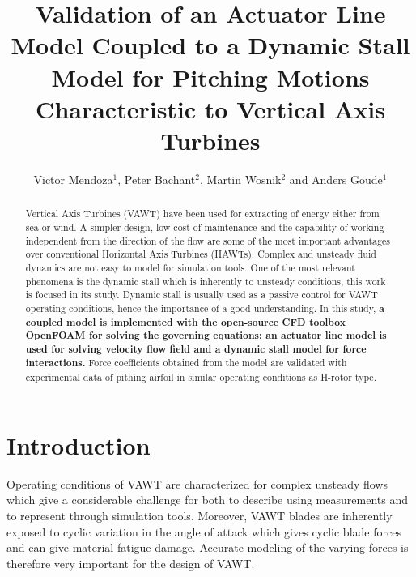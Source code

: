 \documentclass[a4paper]{jpconf}
\begin{document}
\title{Validation of an Actuator Line Model Coupled to a Dynamic Stall Model for
Pitching Motions Characteristic to Vertical Axis Turbines} 

\author{Victor Mendoza$^{1}$, Peter Bachant$^{2}$, Martin Wosnik$^{2}$ and Anders Goude$^{1}$ }
\address{$^{1}$ Department of Engineering Sciences, Division of Electricity, Uppsala University, \\Uppsala 751 21, Sweden}
\address{$^{2}$ Center for Ocean Renewable Energy, University of New Hampshire, 24 Colovos Rd.,\\ Durham, NH 03824, USA}




\begin{abstract}

    Vertical Axis Turbines (VAWT) have been used for extracting of energy either
    from sea or wind. A simpler design, low cost of maintenance and the
    capability of working independent from the direction of the flow are some of
    the most important advantages over conventional Horizontal Axis Turbines
    (HAWTs). Complex and unsteady fluid dynamics are not easy to model for
    simulation tools. One of the most relevant phenomena is the dynamic stall
    which is inherently to unsteady conditions, this work is focused in its
    study. Dynamic stall is usually used as a passive control for VAWT operating
    conditions, hence the importance of a good understanding. In this study,
    \textbf{a coupled model is implemented with the open-source CFD toolbox
    OpenFOAM for solving the governing equations; an actuator line model is used
    for solving velocity flow field and a dynamic stall model for force
    interactions.} Force coefficients obtained from the model are validated with
    experimental data of pithing airfoil in similar operating conditions as
    H-rotor type.

\end{abstract}



\section{Introduction}

Operating conditions of VAWT are characterized for complex unsteady flows which
give a considerable challenge for both to describe using measurements and to
represent through simulation tools\cite{huyer1996unsteady}. Moreover, VAWT
blades are inherently exposed to cyclic variation in the angle of attack which
gives cyclic blade forces and can give material fatigue damage. Accurate
modeling of the varying forces is therefore very important for the design of
VAWT.
\end{document}
